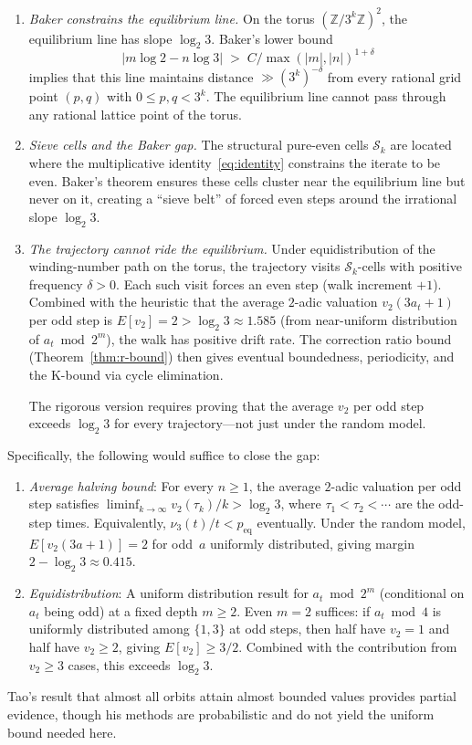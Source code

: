 \documentclass[manuscript]{aomart}
\newcommand{\Z}{\mathbb{Z}}
\theoremstyle{plain}
\theoremstyle{definition}
\theoremstyle{remark}
\numberwithin{equation}{section}
\begin{document}
\begin{enumerate}
\item \emph{Baker constrains the equilibrium line.}\enspace
On the torus $(\Z/3^k\Z)^2$, the equilibrium line has slope
$\log_2 3$.  Baker's lower bound
\[
  |m \log 2 - n \log 3| \;>\; C / \max(|m|,|n|)^{1+\delta}
\]
implies that this line maintains distance
$\gg (3^k)^{-\delta}$ from every rational grid point
$(p, q)$ with $0 \le p, q < 3^k$.  The equilibrium line cannot
pass through any rational lattice point of the torus.

\item \emph{Sieve cells and the Baker gap.}\enspace
The structural pure-even cells $\mathcal{S}_k$ are located where
the multiplicative identity~\eqref{eq:identity} constrains the
iterate to be even.  Baker's theorem ensures these cells cluster
near the equilibrium line but never on it, creating a ``sieve belt''
of forced even steps around the irrational slope $\log_2 3$.

\item \emph{The trajectory cannot ride the equilibrium.}\enspace
Under equidistribution of the winding-number path on the torus,
the trajectory visits $\mathcal{S}_k$-cells with positive
frequency $\delta > 0$.  Each such visit forces an even step
(walk increment $+1$).  Combined with the heuristic that the
average $2$-adic valuation $v_2(3a_t+1)$ per odd step is
$E[v_2] = 2 > \log_2 3 \approx 1.585$ (from near-uniform
distribution of $a_t \bmod 2^m$), the walk has positive drift rate.
The correction ratio bound (Theorem~\ref{thm:r-bound}) then gives
eventual boundedness, periodicity, and the K-bound via cycle
elimination.

The rigorous version requires proving that the average $v_2$ per
odd step exceeds $\log_2 3$ for every trajectory---not just under
the random model.
\end{enumerate}

\noindent
Specifically, the following would suffice to close the gap:
\begin{enumerate}
\item \emph{Average halving bound}: For every $n \ge 1$, the average
  $2$-adic valuation per odd step satisfies
  $\liminf_{k \to \infty} v_2(\tau_k) / k > \log_2 3$,
  where $\tau_1 < \tau_2 < \cdots$ are the odd-step times.  Equivalently,
  $\nu_3(t)/t < p_{\mathrm{eq}}$ eventually.  Under the random model,
  $E[v_2(3a+1)] = 2$ for odd~$a$ uniformly distributed, giving margin
  $2 - \log_2 3 \approx 0.415$.
\item \emph{Equidistribution}: A uniform distribution result for
  $a_t \bmod 2^m$ (conditional on $a_t$ being odd) at a fixed depth
  $m \ge 2$.  Even $m = 2$ suffices: if $a_t \bmod 4$ is uniformly
  distributed among $\{1, 3\}$ at odd steps, then half have $v_2 = 1$
  and half have $v_2 \ge 2$, giving $E[v_2] \ge 3/2$.  Combined with
  the contribution from $v_2 \ge 3$ cases, this exceeds $\log_2 3$.
\end{enumerate}
Tao's result that almost all orbits attain almost bounded values provides
partial evidence, though his methods are probabilistic and do not yield
the uniform bound needed here.
\end{document}
